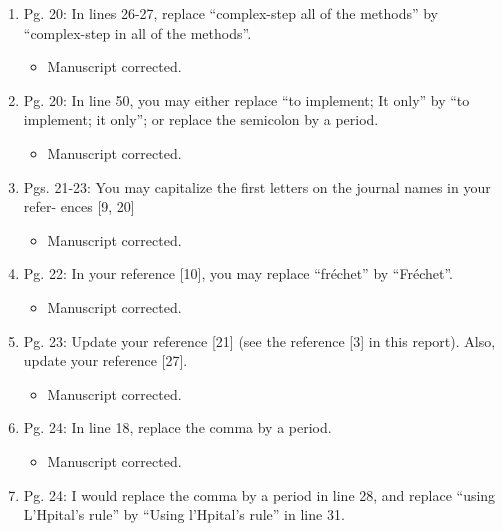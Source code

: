 \documentclass{article}
\begin{document}
\begin{enumerate}
\begin{enumerate}
 \item Pg. 20: In lines 26-27, replace “complex-step all of the methods” by “complex-step
in all of the methods”.

{\color{red}  
\begin{itemize}
     \item
 Manuscript corrected.
  \end{itemize}}

 \item Pg. 20: In line 50, you may either replace “to implement; It only” by “to implement;
it only”; or replace the semicolon by a period.

{\color{red}  
\begin{itemize}
     \item
 Manuscript corrected.
  \end{itemize}}

 \item Pgs. 21-23: You may capitalize the ﬁrst letters on the journal names in your refer-
ences [9, 20]

{\color{red}  
\begin{itemize}
     \item
 Manuscript corrected.
  \end{itemize}}

 \item Pg. 22: In your reference [10], you may replace “fr{\'e}chet” by “Fr{\'e}chet”.

{\color{red}  
\begin{itemize}
     \item
 Manuscript corrected.
  \end{itemize}}

 \item Pg. 23: Update your reference [21] (see the reference [3] in this report). Also,
update your reference [27].

{\color{red}  
\begin{itemize}
     \item
 Manuscript corrected.
  \end{itemize}}

 \item Pg. 24: In line 18, replace the comma by a period.

{\color{red}  
\begin{itemize}
     \item
 Manuscript corrected.
  \end{itemize}}

 \item Pg. 24: I would replace the comma by a period in line 28, and replace “using
L’H{}pital’s rule” by “Using l’H{}pital’s rule” in line 31.


\end{enumerate}
\end{enumerate}
\end{document}
